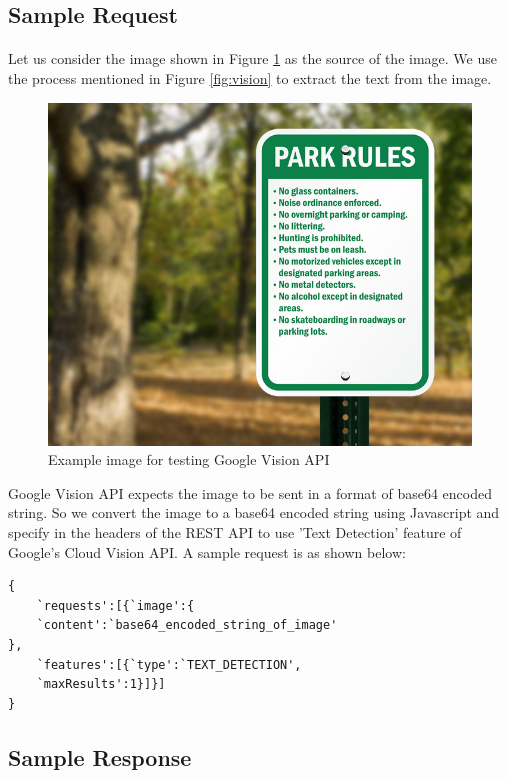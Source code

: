 \documentclass[12pt]{article}
\begin{document}
\subsection{Sample Request}

\paragraph{}Let us consider the image shown in Figure \ref{fig:request_sample} as the source of the image. We use the process mentioned in Figure \ref{fig:vision} to extract the text from the image.

\begin{figure}[H]
	\centering
	\includegraphics[width=1.0\linewidth]{media/request_sample.png}
	\caption{Example image for testing Google Vision API}
	\label{fig:request_sample}
\end{figure} 

Google Vision API expects the image to be sent in a format of base64 encoded string. So we convert the image to a base64 encoded string using Javascript and specify in the headers of the REST API to use 'Text Detection' feature of Google's Cloud Vision API. A sample request is as shown below:

\begin{lstlisting}
{
	`requests':[{`image':{
	`content':`base64_encoded_string_of_image'
},	
	`features':[{`type':`TEXT_DETECTION',
	`maxResults':1}]}]
}
\end{lstlisting}

\subsection{Sample Response}
\end{document}
